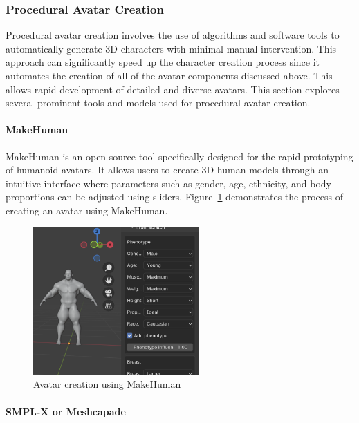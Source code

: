 \documentclass[../../main.tex]{subfiles}
\begin{document}
\subsubsection{Procedural Avatar Creation}
\label{ch:background_work:sign_language_synthesis:3d_techniques:procedural_avatar_creation}

Procedural avatar creation involves the use of algorithms and software tools to automatically generate 3D characters with minimal manual intervention. This approach can significantly speed up the character creation process since it automates the creation of all of the avatar components discussed above. This allows rapid development of detailed and diverse avatars. This section explores several prominent tools and models used for procedural avatar creation.

\paragraph{MakeHuman}
\label{ch:background_work:sign_language_synthesis:3d_techniques:procedural_avatar_creation:makehuman}

MakeHuman is an open-source tool specifically designed for the rapid prototyping of humanoid avatars. It allows users to create 3D human models through an intuitive interface where parameters such as gender, age, ethnicity, and body proportions can be adjusted using sliders. Figure~\ref{fig:makehuman_example} demonstrates the process of creating an avatar using MakeHuman.

\begin{figure} 
  \centering \includegraphics[width = 2.5in]{chapters/background_work/images/makehuman_example.png} 
  \caption{Avatar creation using MakeHuman} 
  \label{fig:makehuman_example} 
\end{figure}

\paragraph{SMPL-X or Meshcapade}
\label{ch:background_work:sign_language_synthesis:3d_techniques:procedural_avatar_creation:smpl_x_meshcapade}
\end{document}
